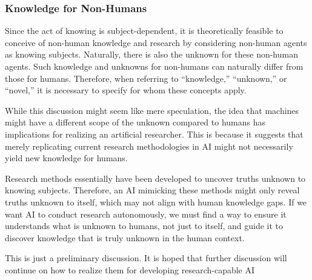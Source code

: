 \subsubsection{Knowledge for Non-Humans}

Since the act of knowing is subject-dependent, it is theoretically feasible to conceive of non-human knowledge and research by considering non-human agents as knowing subjects. Naturally, there is also the unknown for these non-human agents. Such knowledge and unknowns for non-humans can naturally differ from those for humans. Therefore, when referring to ``knowledge,'' ``unknown,'' or ``novel,'' it is necessary to specify for whom these concepts apply.

While this discussion might seem like mere speculation, the idea that machines might have a different scope of the unknown compared to humans has implications for realizing an artificial researcher. This is because it suggests that merely replicating current research methodologies in AI might not necessarily yield new knowledge for humans.

Research methods essentially have been developed to uncover truths unknown to knowing subjects. Therefore, an AI mimicking these methods might only reveal truths unknown to itself, which may not align with human knowledge gaps. If we want AI to conduct research autonomously, we must find a way to ensure it understands what is unknown to humans, not just to itself, and guide it to discover knowledge that is truly unknown in the human context.

This is just a preliminary discussion. It is hoped that further discussion will continue on how to realize them for developing research-capable AI







